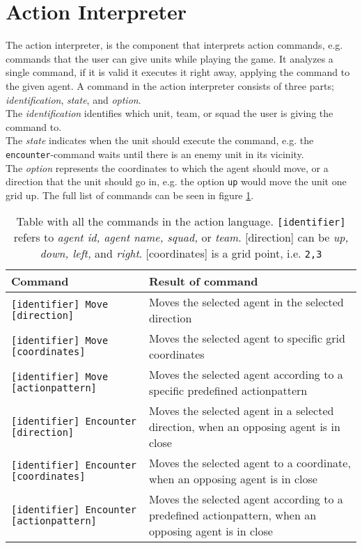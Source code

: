 \section{Action Interpreter}
The action interpreter, is the component that interprets action commands, e.g. commands that the user can give units while playing the game. 
It analyzes a single command, if it is valid it executes it right away, applying the command to the given agent.
A command in the action interpreter consists of three parts; \textit{identification}, \textit{state}, and \textit{option}.\\
The \textit{identification} identifies which unit, team, or squad the user is giving the command to.\\
The \textit{state} indicates when the unit should execute the command, e.g. the \texttt{encounter}-command waits until there is an enemy unit in its vicinity.\\
The \textit{option} represents the coordinates to which the agent should move, or a direction that the unit should go in, e.g. the option \texttt{up} would move the unit one grid up. The full list of commands can be seen in figure \ref{ac_commands}.\\

\begin{center}
	\begin{table}[H]
    \begin{tabular}{| l | p{5cm} |}
    \hline
    Command & Result of command\\ \hline
    \texttt{[identifier] Move [direction]} & Moves the selected agent in the selected direction\\ \hline
    \texttt{[identifier] Move [coordinates]} & Moves the selected agent to specific grid coordinates\\ \hline
		\texttt{[identifier] Move [actionpattern]} & Moves the selected agent according to a specific predefined actionpattern\\ \hline
		\texttt{[identifier] Encounter [direction]} & Moves the selected agent in a selected direction, when an opposing agent is in close\\ \hline
		\texttt{[identifier] Encounter [coordinates]} & Moves the selected agent to a coordinate, when an opposing agent is in close\\ \hline
		\texttt{[identifier] Encounter [actionpattern]} & Moves the selected agent according to a predefined actionpattern, when an opposing agent is in close\\ \hline
    \end{tabular}
		\caption{Table with all the commands in the action language. \texttt{[identifier]} refers to \textit{agent id, agent name, squad,} or \textit{team}. [direction] can be \textit{up, down, left,} and \textit{right}. [coordinates] is a grid point, i.e. \texttt{2,3}}
		\label{ac_commands}
	\end{table}
\end{center}


